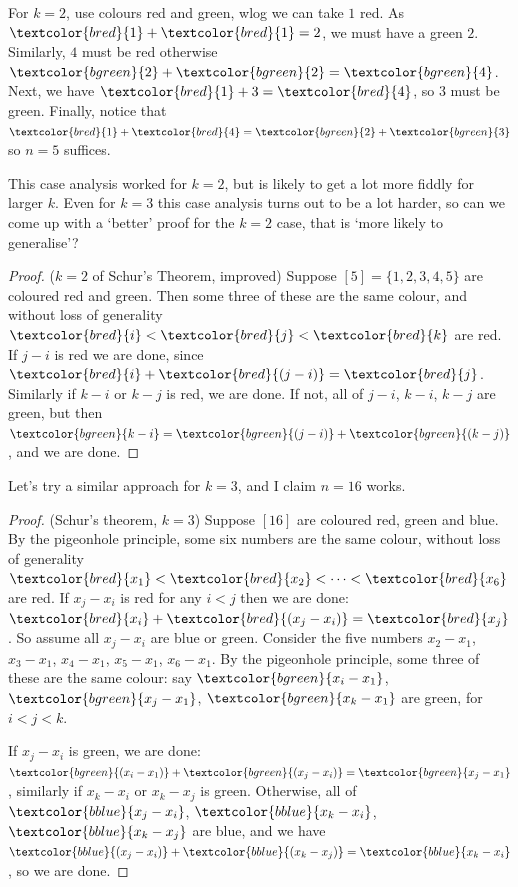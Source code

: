 \documentclass{article}
\newcommand{\red}[1]{\textcolor{bred}{#1}}
\newcommand{\green}[1]{\textcolor{bgreen}{#1}}
\newcommand{\blue}[1]{\textcolor{bblue}{#1}}
\begin{document}
For $k=2$, use colours \red{red} and \green{green}, wlog we can take \red{$1$ red}.
As $\red{1}+\red{1}=2$, we must have a \green{green $2$}.
Similarly, \red{$4$} must be \red{red} otherwise $\green{2}+\green{2}=\green{4}$.
Next, we have $\red{1} + 3 = \red{4}$, so \green{$3$} must be \green{green}.
Finally, notice that $\red{1} + \red{4} = \green{2} + \green{3}$ so $n = 5$ suffices.

This case analysis worked for $k=2$, but is likely to get a lot more fiddly for larger $k$.
Even for $k=3$ this case analysis turns out to be a lot harder, so can we come up with a `better' proof for the $k=2$ case, that is `more likely to generalise'?

\begin{proof}($k=2$ of Schur's Theorem, improved)
    Suppose $[5] = \{1, 2, 3, 4, 5\}$ are coloured \red{red} and \green{green}.
    Then some three of these are the same colour, and without loss of generality $\red{i} < \red{j} < \red{k}$ are \red{red}.
    If $j-i$ is \red{red} we are done, since $\red{i} + \red{(j-i)} = \red{j}$.
    Similarly if $k-i$ or $k-j$ is \red{red}, we are done.
    If not, all of $j-i$, $k-i$, $k-j$ are \green{green}, but then $\green{k-i} = \green{(j-i)} + \green{(k-j)}$, and we are done.
\end{proof}

Let's try a similar approach for $k=3$, and I claim $n=16$ works.

\begin{proof}(Schur's theorem, $k=3$)
    Suppose $[16]$ are coloured \red{red}, \green{green} and \blue{blue}.
    By the pigeonhole principle, some six numbers are the same colour, without loss of generality $\red{x_1} < \red{x_2} < \dots < \red{x_6}$ are \red{red}.
    If $x_j - x_i$ is \red{red} for any $i<j$ then we are done: $\red{x_i} + \red{(x_j - x_i)} = \red{x_j}$.
    So assume all $x_j - x_i$ are \blue{blue} or \green{green}.
    Consider the five numbers $x_2 - x_1$, $x_3 - x_1$, $x_4 - x_1$, $x_5 - x_1$, $x_6 - x_1$.
    By the pigeonhole principle, some three of these are the same colour: say $\green{x_i - x_1}$, $\green{x_j - x_1}$, $\green{x_k - x_1}$ are green, for $i < j < k$.

    If $x_j - x_i$ is \green{green}, we are done: $\green{(x_i - x_1)} + \green{(x_j - x_i)} = \green{x_j - x_1}$, similarly if $x_k - x_i$ or $x_k - x_j$ is \green{green}.
    Otherwise, all of $\blue{x_j - x_i}$, $\blue{x_k - x_i}$, $\blue{x_k - x_j}$ are \blue{blue}, and we have $\blue{(x_j - x_i)} + \blue{(x_k - x_j)} = \blue{x_k - x_i}$, so we are done.
\end{proof}
\end{document}
